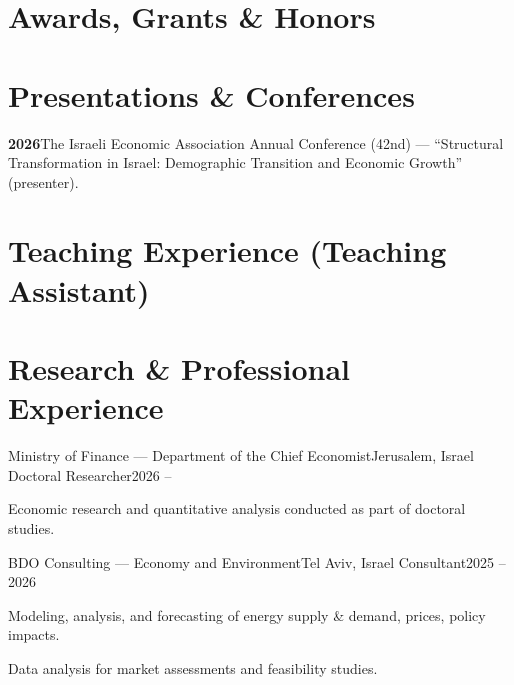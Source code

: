 \documentclass[a4paper, 10pt]{article}
\begin{document}
\section{Awards, Grants \& Honors}

\section{Presentations \& Conferences}
\cvPlain
\item \textbf{2026}\quad The Israeli Economic Association Annual Conference (42nd) ---
``Structural Transformation in Israel: Demographic Transition and Economic Growth'' (presenter).
\cvPlainEnd

\section{Teaching Experience (Teaching Assistant)}

\section{Research \& Professional Experience}
\cventry
{Ministry of Finance --- Department of the Chief Economist}{Jerusalem, Israel}
{Doctoral Researcher}{2026 -- }
\cvItems
\item Economic research and quantitative analysis conducted as part of doctoral studies.
\cvItemsEnd

\cventry
{BDO Consulting --- Economy and Environment}{Tel Aviv, Israel}
{Consultant}{2025 -- 2026}
\cvItems
\item Modeling, analysis, and forecasting of energy supply \& demand, prices, policy impacts.
\item Data analysis for market assessments and feasibility studies.
\cvItemsEnd
\end{document}
